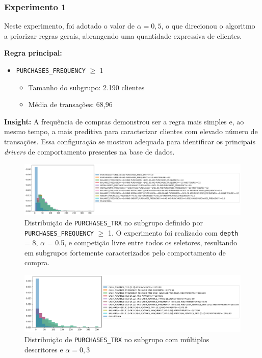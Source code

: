 \documentclass[12pt]{article}
\begin{document}
\subsubsection{Experimento 1}

Neste experimento, foi adotado o valor de $\alpha = 0{,}5$, o que direcionou o algoritmo a priorizar regras gerais, abrangendo uma quantidade expressiva de clientes.

\textbf{Regra principal:}
\begin{itemize}
    \item \texttt{PURCHASES\_FREQUENCY} $\geq$ 1
          \begin{itemize}
              \item Tamanho do subgrupo: 2.190 clientes
              \item Média de transações: 68{,}96
          \end{itemize}
\end{itemize}

\textbf{Insight:} A frequência de compras demonstrou ser a regra mais simples e, ao mesmo tempo, a mais preditiva para caracterizar clientes com elevado número de transações. Essa configuração se mostrou adequada para identificar os principais \textit{drivers} de comportamento presentes na base de dados.

\begin{figure}[h]
    \centering
    \includegraphics[width=1\textwidth]{imagens/experimento1.1.png}
    \caption{Distribuição de \texttt{PURCHASES\_TRX} no subgrupo definido por \texttt{PURCHASES\_FREQUENCY} $\geq$ 1. O experimento foi realizado com \texttt{depth} = 8, $\alpha$ = 0.5, e competição livre entre todos os seletores, resultando em subgrupos fortemente caracterizados pelo comportamento de compra.}
    \label{fig:experimento1_1}
\end{figure}

\begin{figure}[h]
    \centering
    \includegraphics[width=1\textwidth]{imagens/experimento1.2.png}\caption{Distribuição de \texttt{PURCHASES\_TRX} no subgrupo definido por múltiplos descritores financeiros, com $\alpha = 0{,}3$, profundidade máxima igual a 8 e competição restrita a seletores do domínio financeiro. Observa-se que as descrições financeiras apresentam representatividade reduzida na composição do subgrupo.}\caption{Distribuição de \texttt{PURCHASES\_TRX} no subgrupo com múltiplos descritores e $\alpha = 0{,}3$}
    \label{fig:experimento2_1}
\end{figure}
\end{document}
